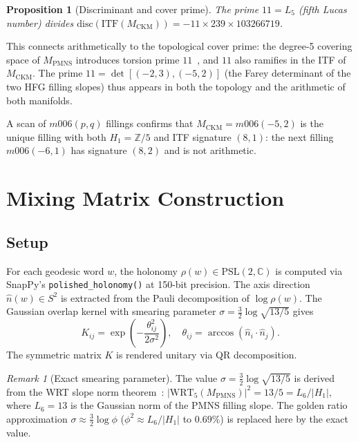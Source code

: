 \documentclass[11pt,a4paper]{article}
\newtheorem{proposition}[theorem]{Proposition}
\theoremstyle{remark}
\newtheorem{remark}[theorem]{Remark}
\newcommand{\MCKM}{M_{\mathrm{CKM}}}
\newcommand{\MPMNS}{M_{\mathrm{PMNS}}}
\newcommand{\Zfive}{\mathbb{Z}/5}
\newcommand{\CC}{\mathbb{C}}
\newcommand{\PSL}{\mathrm{PSL}(2,\CC)}
\begin{document}
\begin{proposition}[Discriminant and cover prime]
The prime $11 = L_5$ (fifth Lucas number) divides
$\mathrm{disc}(\mathrm{ITF}(\MCKM)) = -11\times239\times103266719$.
\end{proposition}

This connects arithmetically to the topological cover prime:
the degree-5 covering space of $\MPMNS$ introduces torsion prime
$11$~\cite{Gentry:Farey}, and $11$ also ramifies in the ITF of $\MCKM$.
The prime $11 = \det[(-2,3),(-5,2)]$ (the Farey determinant of the
two HFG filling slopes) thus appears in both the topology and the
arithmetic of both manifolds.

A scan of $m006(p,q)$ fillings confirms that $\MCKM = m006(-5,2)$
is the unique filling with both $H_1 = \Zfive$ and ITF signature $(8,1)$:
the next filling $m006(-6,1)$ has signature $(8,2)$ and is not arithmetic.

\section{Mixing Matrix Construction}
\label{sec:mixing}

\subsection{Setup}

For each geodesic word $w$, the holonomy $\rho(w) \in \PSL$ is
computed via SnapPy's \texttt{polished\_holonomy()} at 150-bit precision.
The axis direction $\hat{n}(w) \in S^2$ is extracted from the
Pauli decomposition of $\log\rho(w)$.
The Gaussian overlap kernel with smearing parameter
$\sigma = \frac{3}{2}\log\sqrt{13/5}$ gives
\[
K_{ij} = \exp\!\left(-\frac{\theta_{ij}^2}{2\sigma^2}\right),
\quad
\theta_{ij} = \arccos(\hat{n}_i \cdot \hat{n}_j).
\]
The symmetric matrix $K$ is rendered unitary via QR decomposition.

\begin{remark}[Exact smearing parameter]
The value $\sigma = \frac{3}{2}\log\sqrt{13/5}$ is derived from
the WRT slope norm theorem~\cite{Gentry:WRT}:
$|\mathrm{WRT}_5(\MPMNS)|^2 = 13/5 = L_6/|H_1|$,
where $L_6 = 13$ is the Gaussian norm of the PMNS filling slope.
The golden ratio approximation $\sigma \approx \frac{3}{2}\log\phi$
($\phi^2 \approx L_6/|H_1|$ to $0.69\%$) is replaced here by the
exact value.
\end{remark}
\end{document}
